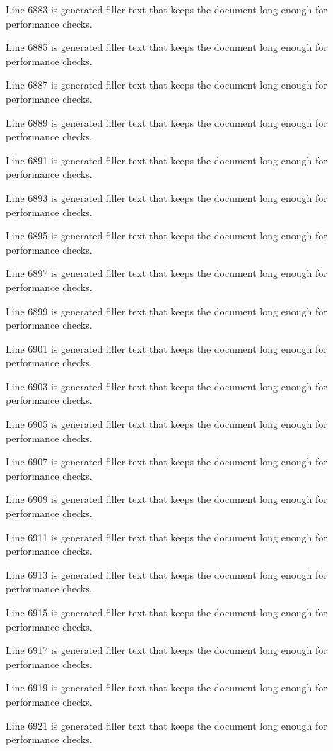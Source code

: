 Line 6883 is generated filler text that keeps the document long enough for performance checks.

Line 6885 is generated filler text that keeps the document long enough for performance checks.

Line 6887 is generated filler text that keeps the document long enough for performance checks.

Line 6889 is generated filler text that keeps the document long enough for performance checks.

Line 6891 is generated filler text that keeps the document long enough for performance checks.

Line 6893 is generated filler text that keeps the document long enough for performance checks.

Line 6895 is generated filler text that keeps the document long enough for performance checks.

Line 6897 is generated filler text that keeps the document long enough for performance checks.

Line 6899 is generated filler text that keeps the document long enough for performance checks.

Line 6901 is generated filler text that keeps the document long enough for performance checks.

Line 6903 is generated filler text that keeps the document long enough for performance checks.

Line 6905 is generated filler text that keeps the document long enough for performance checks.

Line 6907 is generated filler text that keeps the document long enough for performance checks.

Line 6909 is generated filler text that keeps the document long enough for performance checks.

Line 6911 is generated filler text that keeps the document long enough for performance checks.

Line 6913 is generated filler text that keeps the document long enough for performance checks.

Line 6915 is generated filler text that keeps the document long enough for performance checks.

Line 6917 is generated filler text that keeps the document long enough for performance checks.

Line 6919 is generated filler text that keeps the document long enough for performance checks.

Line 6921 is generated filler text that keeps the document long enough for performance checks.

